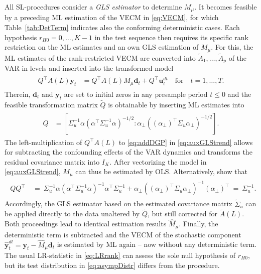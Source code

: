 All SL-procedures consider a \textit{GLS estimator} to determine $ M_\mu $. It becomes feasible by a preceding ML estimation of the VECM in \eqref{eq:VECM}, for which Table~\ref{tab:DetTerm} indicates also the conforming deterministic cases. Each hypothesis $ r_{H0} = 0,\ldots,K-1 $ in the test sequence then requires its specific rank restriction on the ML estimates and an own GLS estimation of $ M_\mu $. For this, the ML estimates of the rank-restricted VECM are converted into $ \widetilde{A}_1, \ldots , \widetilde{A}_p $ of the VAR in levels and inserted into the transformed model
\begin{align} \label{eq:auxGLStrend}
\begin{split}
	{Q}^\top {A}(L) \boldsymbol{y}_t & = {Q}^\top {A}(L) M_\mu \boldsymbol{d}_t + {Q}^\top \boldsymbol{u}^{d \! t}_{t} \quad \text{for} \quad t=1,\ldots,T.
\end{split}
\end{align}
Therein, $ \boldsymbol{d}_t $ and $ \boldsymbol{y}_{t} $ are set to initial zeros in any presample period $ t \leq 0 $ and the feasible transformation matrix $ \widetilde{Q} $ is obtainable by inserting ML estimates into
\begin{align} \label{eq:GLStrend}
\begin{split}
	Q & = \left[ \Sigma_u^{-1} \alpha \left( \alpha^\top \Sigma_u^{-1} \alpha \right)^{-1/2} : \alpha_\perp \left( \left( \alpha_\perp \right)^\top \Sigma_u \alpha_\perp \right)^{-1/2} \right].
\end{split}
\end{align}
The left-multiplication of $ {Q}^\top {A}(L) $ to \eqref{eq:addDGP} in \eqref{eq:auxGLStrend} allows for subtracting the confounding effects of the VAR dynamics and transforms the residual covariance matrix into $ I_K $. After vectorizing the model in \eqref{eq:auxGLStrend}, $ M_\mu $ can thus be estimated by OLS. Alternatively, \citet[p. 438]{SaikkonenLutkepohl2000c} show that 
\begin{align} \label{eq:GLStrend2}
\begin{split}
	QQ^\top & \ = \ \Sigma_u^{-1} \alpha \left( \alpha^\top \Sigma_u^{-1} \alpha \right)^{-1} \alpha^\top \Sigma_u^{-1} + \alpha_\perp \left( \left( \alpha_\perp \right)^\top \Sigma_u \alpha_\perp \right)^{-1} \left( \alpha_\perp \right)^\top \ = \ \Sigma_u^{-1}.
\end{split}
\end{align} 
Accordingly, the GLS estimator based on the estimated covariance matrix $ \widetilde{\Sigma}_u $ can be applied directly to the data unaltered by $ \widetilde{Q} $, but still corrected for $ \widetilde{A}(L) $. Both proceedings lead to identical estimation results $ \widehat{M}_\mu $. Finally, the deterministic term is subtracted and the VECM of the stochastic component $ \boldsymbol{\hat{y}}^{d \! t}_{t} = \boldsymbol{y}_t - \widehat{M}_\mu \boldsymbol{d}_t $ is estimated by ML again -- now without any deterministic term. The usual LR-statistic in \eqref{eq:LRrank} can assess the sole null hypothesis of $ r_{H0} $, but its test distribution in \eqref{eq:asympDistr} differs from the \citeauthor{Johansen1988} procedure.


